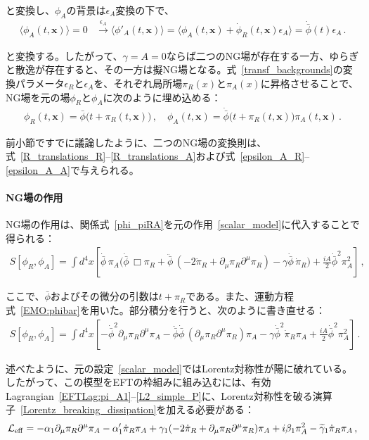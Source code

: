 と変換し、$\phi_A$の背景は$\epsilon_A$変換の下で、
\begin{align}
 \langle\phi_A (t,\mathbf{x})\rangle 
 = 0  &\xrightarrow { \epsilon_A } \langle \phi'_A (t,\mathbf{x})\rangle =
 \langle \phi_A(t,\mathbf{x})+\dot{\phi}_R (t,\mathbf{x})\epsilon_A\rangle=\dot{\bar{\phi}}(t)\epsilon_A\,.
\end{align}

と変換する。したがって、$\gamma=A=0$ならば二つのNG場が存在する一方、ゆらぎと散逸が存在すると、その一方は擬NG場となる。式~\eqref{transf_backgrounds}の変換パラメータ$\epsilon_R$と$\epsilon_A$を、それぞれ局所場$\pi_R (x)$と$\pi_A (x)$に昇格させることで、NG場を元の場$\phi_R$と$\phi_A$に次のように埋め込める：
\begin{align}
\label{phi_piRA}
 \phi_R(t,\mathbf{x}) 
 = \bar{\phi} \big( t+\pi_R(t,\mathbf{x}) \big)\,,
 \quad
 \phi_A(t,\mathbf{x}) 
 = \dot{\bar{\phi}} \big(t+\pi_R(t,\mathbf{x}) \big) \pi_A (t,\mathbf{x}) \,.
\end{align}

前小節ですでに議論したように、二つのNG場の変換則は、式~\eqref{R_translations_R}--\eqref{R_translations_A}および式~\eqref{epsilon_A_R}--\eqref{epsilon_A_A}で与えられる。

\paragraph{NG場の作用}
NG場の作用は、関係式~\eqref{phi_piRA}を元の作用~\eqref{scalar_model}に代入することで得られる：
\begin{align}
S[\phi_R,\phi_A] 
=\int d^4x\left[
\dot{\bar{\phi}}\,\pi_A\Big(\dot{\bar{\phi}}\,\Box\pi_R+\ddot{\bar{\phi}}\,(-2\dot{\pi}_R+\partial_\mu\pi_R\partial^\mu\pi_R)
 - \gamma\dot{\bar{\phi}}\,\dot{\pi}_R\Big)
 +\frac{iA}{2}\dot{\bar{\phi}}^2\pi_A^2
 \right]\,,
\end{align}

ここで、$\bar{\phi}$およびその微分の引数は$t+\pi_R$である。また、運動方程式~\eqref{EMO:phibar}を用いた。部分積分を行うと、次のように書き直せる：
\begin{align}
\label{model_pi}
S[\phi_R,\phi_A] 
=\int d^4x\left[
-\dot{\bar{\phi}}^2
\partial_\mu\pi_R\partial^\mu\pi_A
-\ddot{\bar{\phi}}\dot{\bar{\phi}}\,
(\partial_\mu\pi_R\partial^\mu\pi_R)\pi_A
 - \gamma\dot{\bar{\phi}}^2\dot{\pi}_R\pi_A
 +\frac{iA}{2}\dot{\bar{\phi}}^2\pi_A^2
 \right]\,.
\end{align}

述べたように、元の設定~\eqref{scalar_model}ではLorentz対称性が陽に破れている。したがって、この模型をEFTの枠組みに組み込むには、有効Lagrangian~\eqref{EFTLag:pi_A1}--\eqref{L2_simple_P}に、Lorentz対称性を破る演算子~\eqref{Lorentz_breaking_dissipation}を加える必要がある：
\begin{align}
\label{EFT_Lbreaking}
\mathcal{L}_{\rm eff}=
-\alpha_1
\partial_\mu\pi_R\partial^\mu\pi_A
-\alpha_1'\dot{\pi}_R\pi_A
+\gamma_1
(-2\dot{\pi}_R+\partial_\mu\pi_R\partial^\mu\pi_R)\pi_A
+i\beta_1\pi_A^2
- \widetilde{\gamma}_1\dot{\pi}_R\pi_A\,,
\end{align}

